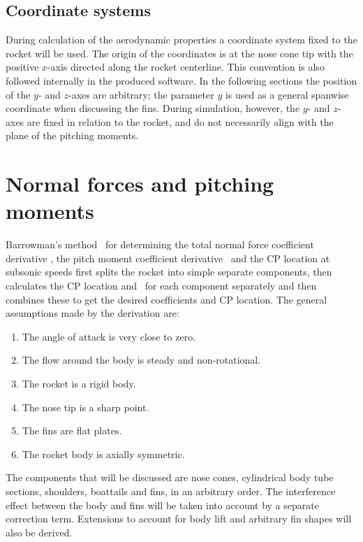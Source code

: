 \subsection{Coordinate systems}

During calculation of the aerodynamic properties a coordinate system
fixed to the rocket will be used.  The origin of the coordinates is at
the nose cone tip with the positive $x$-axis directed along the rocket
centerline.  This convention is also followed internally in the
produced software.  In the following sections the position of the $y$-
and $z$-axes are arbitrary; the parameter $y$ is used as a general
spanwise coordinate when discussing the fins.  During simulation,
however, the $y$- and $z$-axes are fixed in relation to the rocket,
and do not necessarily align with the plane of the pitching moments.



\clearpage
\section{Normal forces and pitching moments}

Barrowman's method~\cite{barrowman-thesis} for determining the total
normal force coefficient derivative \CNa, the pitch moment
coefficient derivative \Cma\ and the CP location at subsonic speeds
first splits the rocket into simple separate components, then
calculates the CP location and \CNa\ for each component separately and
then combines these to get the desired coefficients and CP
location.  The general assumptions made by the derivation are:
%
\begin{enumerate}
\item The angle of attack is very close to zero.
\item The flow around the body is steady and non-rotational.
\item The rocket is a rigid body.
\item The nose tip is a sharp point.
\item The fins are flat plates.
\item The rocket body is axially symmetric.
\end{enumerate}

The components that will be discussed are nose cones, cylindrical body
tube sections, shoulders, boattails and fins, in an arbitrary
order.  The interference effect between the body and fins will be
taken into account by a separate correction term.  Extensions to
account for body lift and arbitrary fin shapes will also be derived.


